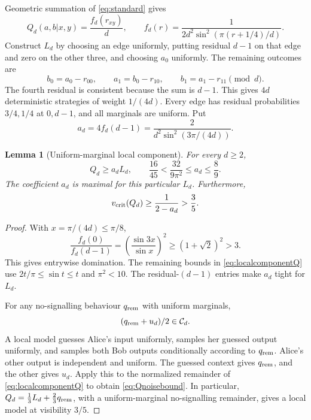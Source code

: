 \documentclass[11pt]{amsart}
\newtheorem{lemma}[theorem]{Lemma}
\theoremstyle{remark}
\theoremstyle{plain}
\numberwithin{equation}{section}
\newcommand{\Loc}{\mathcal C}
\begin{document}
Geometric summation of \eqref{eq:standard} gives
\begin{equation}\label{eq:Qd}
 Q_d(a,b|x,y)=\frac{f_d(r_{xy})}{d},\qquad
 f_d(r)=\frac1{2d^2\sin^2(\pi(r+1/4)/d)}.
\end{equation}
Construct \(L_d\) by choosing an edge uniformly, putting residual
\(d-1\) on that edge and zero on the other three, and choosing \(a_0\)
uniformly. The remaining outcomes are
\[
 b_0=a_0-r_{00},\qquad
 a_1=b_0-r_{10},\qquad
 b_1=a_1-r_{11}\pmod d.
\]
The fourth residual is consistent because the sum is \(d-1\).
This gives \(4d\) deterministic strategies of weight \(1/(4d)\).
Every edge has residual probabilities \(3/4,1/4\) at \(0,d-1\),
and all marginals are uniform. Put
\[
 a_d=4f_d(d-1)=\frac2{d^2\sin^2(3\pi/(4d))}.
\]

\begin{lemma}[Uniform-marginal local component]\label{lem:standardlocal}
For every \(d\ge2\),
\begin{equation}\label{eq:localcomponentQ}
 Q_d\ge a_dL_d,\qquad
 \frac{16}{45}<\frac{32}{9\pi^2}\le a_d\le\frac89.
\end{equation}
The coefficient \(a_d\) is maximal for this particular \(L_d\).
Furthermore,
\begin{equation}\label{eq:Qnoisebound}
 v_{\rm crit}(Q_d)\ge\frac1{2-a_d}>\frac35.
\end{equation}
\end{lemma}

\begin{proof}
With \(x=\pi/(4d)\le\pi/8\),
\[
 \frac{f_d(0)}{f_d(d-1)}
 =\left(\frac{\sin3x}{\sin x}\right)^2
 \ge(1+\sqrt2)^2>3.
\]
This gives entrywise domination. The remaining bounds in
\eqref{eq:localcomponentQ} use
\(2t/\pi\le\sin t\le t\) and \(\pi^2<10\).
The residual-\((d-1)\) entries make \(a_d\) tight for \(L_d\).

For any no-signalling behaviour \(q_{\rm rem}\) with uniform marginals,
\begin{equation}\label{eq:halfnoise}
 (q_{\rm rem}+u_d)/2\in\Loc_d.
\end{equation}
A local model guesses Alice's input uniformly, samples her guessed
output uniformly, and samples both Bob outputs conditionally according
to \(q_{\rm rem}\). Alice's other output is independent and uniform.
The guessed context gives \(q_{\rm rem}\), and the other gives \(u_d\).
Apply this to the normalized remainder of
\eqref{eq:localcomponentQ} to obtain \eqref{eq:Qnoisebound}.
In particular,
\(Q_d=\frac13L_d+\frac23q_{\rm rem}\), with a uniform-marginal
no-signalling remainder, gives a local model at visibility \(3/5\).
\end{proof}
\end{document}
